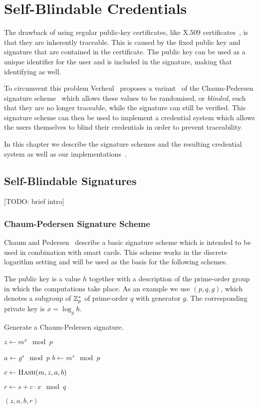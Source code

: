 \chapter{Self-Blindable Credentials}

The drawback of using regular public-key certificates, like X.509
certificates~\cite{ISO9594-8}, is that they are inherently traceable. This is
caused by the fixed public key and signature that are contained in the
certificate. The public key can be used as a unique identifier for the user and
is included in the signature, making that identifying as well.

To circumvent this problem Verheul~\cite{Verheul01} proposes a
variant~\cite{BonehLS01,BonehLS04} of the Chaum-Pedersen signature
scheme~\cite{ChaumPedersen93} which allows these values to be randomised, or
\emph{blinded}, such that they are no longer traceable, while the signature can
still be verified. This signature scheme can then be used to implement a
credential system which allows the users themselves to blind their credentials
in order to prevent traceability.

In this chapter we describe the signature schemes and the resulting credential
system as well as our implementations~\cite{BatinaHJMV10,HoepmanJV10}.

\section{Self-Blindable Signatures}

[TODO: brief intro]

\subsection{Chaum-Pedersen Signature Scheme}

Chaum and Pedersen~\cite{ChaumPedersen93} describe a basic signature scheme
which is intended to be used in combination with smart cards. This scheme works
in the discrete logarithm setting and will be used as the basis for the
following schemes.

The public key is a value $h$ together with a description of the prime-order
group in which the computations take place. As an example we use $(p, q, g)$,
which denotes a subgroup of $\mathbb{Z}^*_p$ of prime-order $q$ with generator $g$. The
corresponding private key is $x = \log_g h$.

\begin{algorithm}[t]
  \caption{Generate a Chaum-Pedersen signature.}
  \label{alg:CP-sign}
  \addtolength{\baselineskip}{1mm}
  \begin{algorithmic}[1]
      \State $z \gets m^x \mod p$

      \State $a \gets g^s \mod p$
      \State $b \gets m^s \mod p$

      \State $c \gets \Call{Hash}{m, z, a, b}$

      \State $r \gets s + c \cdot x \mod q$

      \Return $(z, a, b, r)$
    \EndFunction
  \end{algorithmic}
\end{algorithm}

